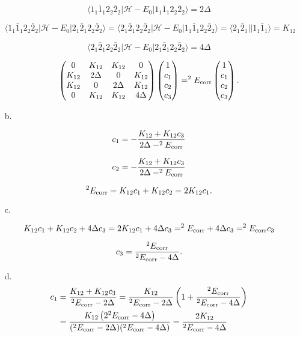 \documentclass[a4paper]{book}
\newcommand{\corr}{{\rm corr}}
\begin{document}
\begin{solution}
\begin{itemize}
	\[
		\langle 1_1 \bar{1}_1 2_2 \bar{2}_2 | \mathscr{H} - E_0 | 1_1 \bar{1}_1 2_2 \bar{2}_2 \rangle = 2 \Delta
	\]
		
	\[
		\langle 1_1 \bar{1}_1 2_2 \bar{2}_2 | \mathscr{H} - E_0 | 2_1 \bar{2}_1 2_2 \bar{2}_2 \rangle = \langle 2_1 \bar{2}_1 2_2 \bar{2}_2 | \mathscr{H} - E_0 | 1_1 \bar{1}_1 2_2 \bar{2}_2 \rangle = \langle 2_1 \bar{2}_1 || 1_1 \bar{1}_1 \rangle = K_{12}
	\]
	
	\[
		\langle 2_1 \bar{2}_1 2_2 \bar{2}_2 | \mathscr{H} - E_0 | 2_1 \bar{2}_1 2_2 \bar{2}_2 \rangle = 4 \Delta
	\]
	
	\[
		\begin{pmatrix}
			0 		& K_{12} 	& K_{12} 	& 0 		\\
			K_{12} 	& 2\Delta 	& 0 		& K_{12} 	\\
			K_{12} 	& 0			& 2\Delta 	& K_{12}	 \\
			0 		& K_{12} 	& K_{12} 	& 4\Delta
		\end{pmatrix}
		\begin{pmatrix}
			1 \\ c_1 \\ c_2 \\ c_3
		\end{pmatrix} = ^2 E_\corr \begin{pmatrix}
			1 \\ c_1 \\ c_2 \\ c_3
		\end{pmatrix}.
	\]
	
	\item[b.]
	
	\[
		c_1 = - \frac{ K_{12} + K_{12} c_3 }{ 2\Delta - ^2 E_\corr }
	\]	
	
	\[
		c_2 = - \frac{ K_{12} + K_{12} c_3 }{ 2\Delta - ^2 E_\corr }
	\]	
	
	\[
		^2 E_\corr = K_{12} c_1 + K_{12} c_2 = 2 K_{12} c_1. 
	\]
	
	\item[c.]
	
	\[
		K_{12} c_1 + K_{12} c_2 + 4 \Delta c_3 = 2 K_{12} c_1 + 4 \Delta c_3 = ^2 E_\corr + 4 \Delta c_3 = ^2 E_\corr c_3
	\]
	
	\[
		c_3 = \frac{ ^2 E_\corr }{ ^2 E_\corr - 4 \Delta }.
	\]
	
	\item[d.]
	\begin{align*}
		c_1 &= \frac{ K_{12} + K_{12} c_3 }{  ^2 E_\corr - 2\Delta } =  \frac{ K_{12} }{ ^2 E_\corr - 2\Delta } \left( 1 + \frac{ ^2 E_\corr }{ ^2 E_\corr - 4 \Delta } \right) \notag \\
		&= \frac{ K_{12}  \left( 2 ^2 E_\corr - 4 \Delta \right) }{ ( ^2 E_\corr - 2\Delta )( ^2 E_\corr - 4 \Delta ) } = \frac{ 2K_{12} }{ ^2 E_\corr - 4 \Delta }
	\end{align*}
	

\end{itemize}
\end{solution}
\end{document}
